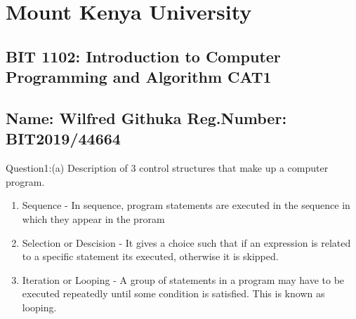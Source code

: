 \message{ !name(bit2019_44664_cat1.tex)}\documentclass[12pt,legal]{article}
\begin{document}


\section{Mount Kenya University}
\subsection{BIT 1102: Introduction to Computer Programming and Algorithm CAT1}
\subsection{Name: Wilfred Githuka Reg.Number: BIT2019/44664}

Question1:(a) Description of 3 control structures that make up a computer program.
\begin{enumerate}
  \item{Sequence - In sequence, program statements are executed in the sequence
      in which they appear in the proram}
  \item{Selection or Descision - It gives a choice such that if an expression
      is related to a specific statement its executed, otherwise it is skipped.}
    \item{Iteration or Looping - A group of statements in a program may have to
        be executed repeatedly until some condition is satisfied. This is known
        as looping.}
      \end{enumerate}
    
\end{document}
